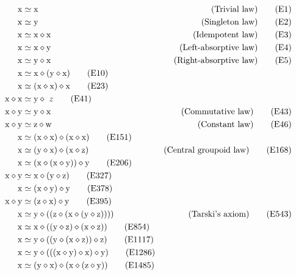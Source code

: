 \begin{align}
        \x &\formaleq \x & \hbox{(Trivial law)} \label{eq1}\tag{E1} \\
        \x &\formaleq \y & \hbox{(Singleton law)} \label{eq2}\tag{E2} \\
        \x &\formaleq \x \op \x & \hbox{(Idempotent law)} \label{eq3}\tag{E3} \\
        \x &\formaleq \x \op \y & \hbox{(Left-absorptive law)} \label{eq4}\tag{E4} \\
        \x &\formaleq \y \op \x & \hbox{(Right-absorptive law)} \label{eq5}\tag{E5} \\
        \x &\formaleq \x \op (\y \op \x) \label{eq10}\tag{E10} \\
        \x &\formaleq (\x \op \x) \op \x \label{eq23}\tag{E23} \\
        \x \op \x &\formaleq \y \op\ z \label{eq41}\tag{E41} \\
        \x \op \y &\formaleq \y \op \x & \hbox{(Commutative law)} \label{eq43}\tag{E43} \\
        \x \op \y &\formaleq \z \op \w & \hbox{(Constant law)} \label{eq46}\tag{E46} \\
        \x &\formaleq (\x \op \x) \op (\x \op \x) \label{eq151}\tag{E151} \\
        \x &\formaleq (\y \op \x) \op (\x \op \z) & \hbox{(Central groupoid law)} \label{eq168}\tag{E168} \\
        \x &\formaleq (\x \op (\x \op \y)) \op \y \label{eq206}\tag{E206} \\
        \x \op \y &\formaleq \x \op (\y \op \z) \label{eq327}\tag{E327} \\
        \x &\formaleq (\x \op \y) \op \y \label{eq378}\tag{E378} \\
        \x \op \y &\formaleq (\z \op \x) \op \y \label{eq395}\tag{E395} \\
        \x &\formaleq \y \op ( (\z \op (\x \op (\y \op \z)))) & \hbox{(Tarski's axiom)} \label{eq543}\tag{E543} \\
        \x &\formaleq \x \op ((\y \op \z) \op (\x \op \z)) \label{eq854}\tag{E854}\\
        \x &\formaleq \y \op ((\y \op (\x \op \z)) \op \z) \label{eq1117}\tag{E1117} \\
        \x &\formaleq \y \op (((\x \op \y) \op \x) \op \y) \label{eq1286}\tag{E1286} \\
        \x &\formaleq (\y \op \x) \op (\x \op (\z \op \y)) \label{eq1485}\tag{E1485} \\

\end{align}
